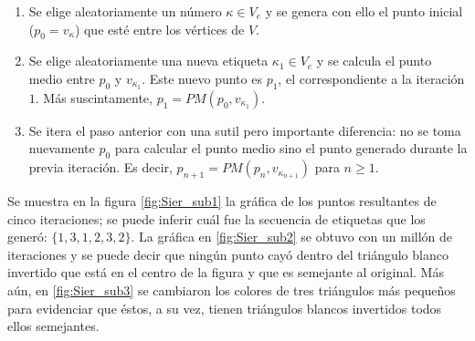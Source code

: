 \documentclass[letterpaper,12pt,oneside]{book}
\begin{document}
\begin{enumerate}
    \item Se elige aleatoriamente un número $\kappa \in V_{e}$ y se genera con ello el punto inicial ($p_{0} = v_{\kappa}$) que esté entre los vértices de $V$.
    \item Se elige aleatoriamente una nueva etiqueta $\kappa_{1} \in V_{e}$ y se calcula el punto medio entre $p_{0}$ y $v_{\kappa_{1}}$. Este nuevo punto es $p_{1}$, el correspondiente a la iteración $1$. Más suscintamente, $p_{1} = PM(p_{0}, v_{\kappa_{1}})$.
    \item Se itera el paso anterior con una sutil pero importante diferencia: no se toma nuevamente $p_{0}$ para calcular el punto medio sino el punto generado durante la previa iteración. Es decir, $p_{n+1} = PM(p_{n}, v_{\kappa_{n+1}})$ para $n \geq 1$.
\end{enumerate}

Se muestra en la figura \ref{fig:Sier_sub1} la gráfica de los puntos resultantes de cinco iteraciones; se puede inferir cuál fue la secuencia de etiquetas que los generó: $\{ 1,3,1,2,3,2 \}$. La gráfica en \ref{fig:Sier_sub2} se obtuvo con un millón de iteraciones y se puede decir que ningún punto cayó dentro del triángulo blanco invertido que está en el centro de la figura y que es semejante al original. Más aún, en \ref{fig:Sier_sub3} se cambiaron los colores de tres triángulos más pequeños para evidenciar que éstos, a su vez, tienen triángulos blancos invertidos todos ellos semejantes. 
\end{document}
